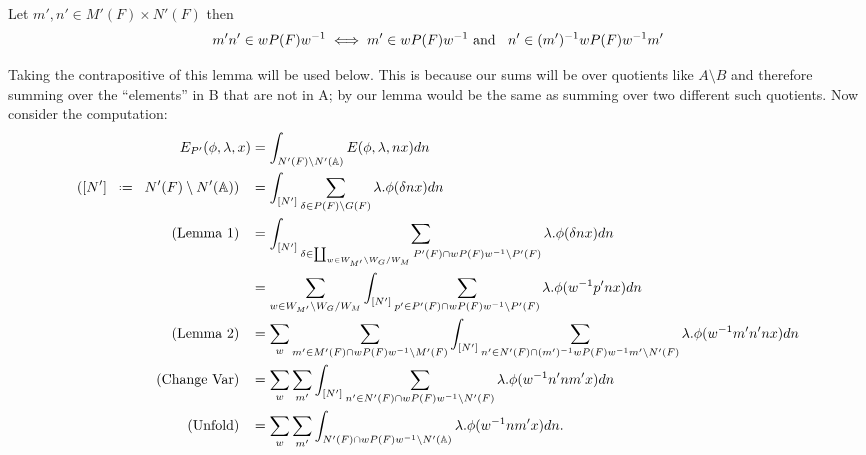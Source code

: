     \begin{Lemma}\label{lem:2}
        Let \(m', n'\in M'(F)\times N'(F)\) then 
        \[m'n' \in wP(F)w^{-1} \iff m'\in wP(F)w^{-1} \text{ and  }\;\; n'\in (m')^{-1} wP(F)w^{-1} m'\]
    \end{Lemma}
    Taking the contrapositive of this lemma will be used below. This is because our sums will be over quotients like \(A\setminus B\) and therefore summing over the ``elements'' in B that are not in A; by our lemma would be the same as summing over two different such quotients.
    Now consider the computation:
    \begin{equation*}
        \begin{aligned}
            E_{P'}( \phi, \lambda, x) &= \int_{N'(F)\setminus N'(\A)} E( \phi, \lambda, nx) dn\\
                                    ([N']\defeq N'(F)\setminus N'(\A)) \;\;\; &= \int_{[N']} \sum_{\delta\in P(F)\setminus G(F)} \lambda.\phi(\delta nx)  dn\\
                                    (\text{Lemma 1}) \;\;\; &= \int_{[N']} \sum_{\delta\in \coprod_{w\in W_{M'}\setminus W_G / W_{M}} P'(F)\cap wP(F)w\inv \setminus P'(F)} \lambda.\phi(\delta nx)  dn\\
                                     &= \sum_{ w\in W_{M'}\setminus W_G / W_{M}}\int_{[N']} \sum_{p'\in P'(F)\cap wP(F)w\inv \setminus P'(F)} \lambda.\phi( w\inv p'nx)  dn\\
                                    (\text{Lemma 2}) \;\;\; &= \sum_{ w} \sum_{m'\in M'(F)\cap wP(F)w\inv\setminus M'(F)} \int_{[N']} \sum_{n'\in N'(F)\cap (m')\inv wP(F)w\inv m' \setminus N'(F)} \lambda.\phi( w\inv m'n'nx)  dn\\
                                    (\text{Change Var}) \;\;\; &= \sum_{ w} \sum_{m'} \int_{[N']} \sum_{n'\in N'(F)\cap wP(F)w\inv\setminus N'(F) } \lambda.\phi( w\inv n'nm'x)  dn\\
                                    (\text{Unfold}) \;\;\; &= \sum_{ w} \sum_{m'} \int_{N'(F)\cap wP(F)w\inv \setminus N'(\A)} \lambda.\phi( w\inv nm' x)  dn.\\
        \end{aligned}
    \end{equation*}
